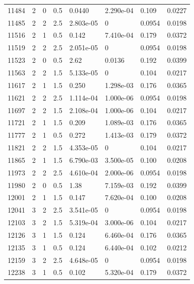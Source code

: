 \documentclass[preview]{standalone}
\begin{document}
{{{{{{\begin{tabular}{L{1.2cm}C{1.2cm} C{0.3cm}C{0.5cm} C{1.4cm}C{1.4cm} C{1.4cm}C{1.4cm}}
  11484  &     2  & 0     & 0.5 &  0.0440  & 2.290e-04  & 0.109 &  0.0227   \\ 
  11485  &     2  & 2     & 2.5 &  2.803e-05  & 0  & 0.0954 &  0.0198   \\ 
  11516  &     2  & 1     & 0.5 &  0.142  & 7.410e-04  & 0.179 &  0.0372   \\ 
  11519  &     2  & 2     & 2.5 &  2.051e-05  & 0  & 0.0954 &  0.0198   \\ 
  11523  &     2  & 0     & 0.5 &  2.62  & 0.0136  & 0.192 &  0.0399   \\ 
  11563  &     2  & 2     & 1.5 &  5.133e-05  & 0  & 0.104 &  0.0217   \\ 
  11617  &     2  & 1     & 1.5 &  0.250  & 1.298e-03  & 0.176 &  0.0365   \\ 
  11621  &     2  & 2     & 2.5 &  1.114e-04  & 1.000e-06  & 0.0954 &  0.0198   \\ 
  11697  &     2  & 2     & 1.5 &  2.108e-04  & 1.000e-06  & 0.104 &  0.0217   \\ 
  11721  &     2  & 1     & 1.5 &  0.209  & 1.089e-03  & 0.176 &  0.0365   \\ 
  11777  &     2  & 1     & 0.5 &  0.272  & 1.413e-03  & 0.179 &  0.0372   \\ 
  11821  &     2  & 2     & 1.5 &  4.353e-05  & 0  & 0.104 &  0.0217   \\ 
  11865  &     2  & 1     & 1.5 &  6.790e-03  & 3.500e-05  & 0.100 &  0.0208   \\ 
  11973  &     2  & 2     & 2.5 &  4.610e-04  & 2.000e-06  & 0.0954 &  0.0198   \\ 
  11980  &     2  & 0     & 0.5 &  1.38  & 7.159e-03  & 0.192 &  0.0399   \\ 
  12001  &     2  & 1     & 1.5 &  0.147  & 7.620e-04  & 0.100 &  0.0208   \\ 
  12041  &     3  & 2     & 2.5 &  3.541e-05  & 0  & 0.0954 &  0.0198   \\ 
  12103  &     3  & 2     & 1.5 &  5.319e-04  & 3.000e-06  & 0.104 &  0.0217   \\ 
  12126  &     3  & 1     & 1.5 &  0.124  & 6.460e-04  & 0.176 &  0.0365   \\ 
  12135  &     3  & 1     & 0.5 &  0.124  & 6.440e-04  & 0.102 &  0.0212   \\ 
  12159  &     3  & 2     & 2.5 &  4.648e-05  & 0  & 0.0954 &  0.0198   \\ 
  12238  &     3  & 1     & 0.5 &  0.102  & 5.320e-04  & 0.179 &  0.0372   \\ 

\end{tabular}}}}}}}
\end{document}
